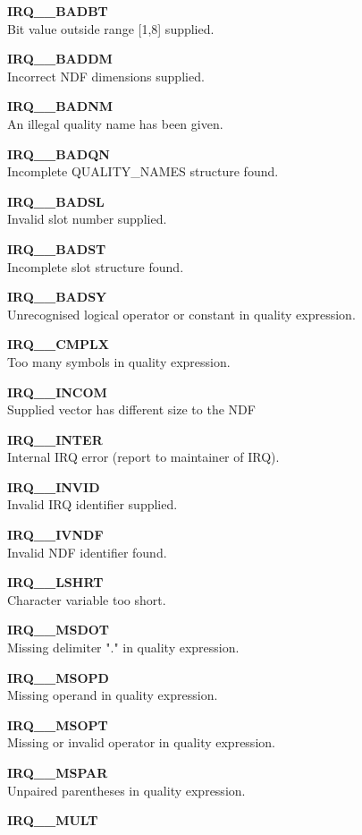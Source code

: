 \begin{description}
\item {\bf IRQ\_\_BADBT}\\ 
Bit value outside range [1,8] supplied.
\item {\bf IRQ\_\_BADDM}\\
Incorrect NDF dimensions supplied.
\item {\bf IRQ\_\_BADNM}\\ 
An illegal quality name has been given.
\item {\bf IRQ\_\_BADQN}\\ 
Incomplete QUALITY\_NAMES structure found.
\item {\bf IRQ\_\_BADSL}\\ 
Invalid slot number supplied.
\item {\bf IRQ\_\_BADST}\\ 
Incomplete slot structure found.
\item {\bf IRQ\_\_BADSY}\\ 
Unrecognised logical operator or constant in quality expression.
\item {\bf IRQ\_\_CMPLX}\\ 
Too many symbols in quality expression.
\item {\bf IRQ\_\_INCOM}\\ 
Supplied vector has different size to the NDF
\item {\bf IRQ\_\_INTER}\\ 
Internal IRQ error (report to maintainer of IRQ).
\item {\bf IRQ\_\_INVID}\\ 
Invalid IRQ identifier supplied.
\item {\bf IRQ\_\_IVNDF}\\ 
Invalid NDF identifier found.
\item {\bf IRQ\_\_LSHRT}\\ 
Character variable too short.
\item {\bf IRQ\_\_MSDOT}\\ 
Missing delimiter "." in quality expression.
\item {\bf IRQ\_\_MSOPD}\\ 
Missing operand in quality expression.
\item {\bf IRQ\_\_MSOPT}\\ 
Missing or invalid operator in quality expression.
\item {\bf IRQ\_\_MSPAR}\\ 
Unpaired parentheses in quality expression.
\item {\bf IRQ\_\_MULT }\\ 

\end{description}
